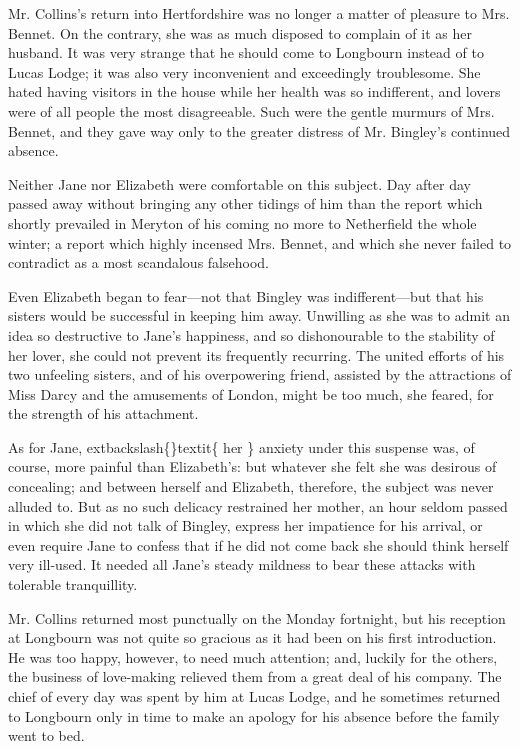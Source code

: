 \documentclass[10pt]{book}
\begin{document}
   Mr. Collins’s return into Hertfordshire was no longer a matter of
pleasure to Mrs. Bennet. On the contrary, she was as much disposed to
complain of it as her husband. It was very strange that he should come
to Longbourn instead of to Lucas Lodge; it was also very inconvenient
and exceedingly troublesome. She hated having visitors in the house
while her health was so indifferent, and lovers were of all people the
most disagreeable. Such were the gentle murmurs of Mrs. Bennet, and they
gave way
   only to the greater distress of Mr. Bingley’s continued
absence.
  

   Neither Jane nor Elizabeth were comfortable on this subject. Day after
day passed away without bringing any other tidings of him than the
report which shortly prevailed in Meryton of his coming no more to
Netherfield the whole winter; a report which highly incensed Mrs.
Bennet, and which she never failed to contradict as a most scandalous
falsehood.
  

   Even Elizabeth began to fear—not that Bingley was indifferent—but that
his sisters would be successful in keeping him away. Unwilling as she
was to admit an idea so destructive to Jane’s happiness, and so
dishonourable to the stability of her lover, she could not prevent its
frequently recurring. The united efforts of his two unfeeling sisters,
and of his overpowering friend, assisted by the attractions of Miss
Darcy and the amusements of London, might be too much, she feared, for
the strength of his attachment.
  

   As for Jane,
   	extbackslash\{\}textit\{
    her
   \}
   anxiety under this suspense was, of course, more
painful than Elizabeth’s: but whatever she felt she was desirous of
concealing; and between herself and Elizabeth, therefore, the subject
was never alluded to. But as no such delicacy restrained her mother, an
hour seldom passed in which she did not talk of Bingley, express her
impatience for his arrival, or even require Jane to confess that if he
did not come back she should think herself very ill-used. It needed all
Jane’s steady mildness to bear these attacks with tolerable
tranquillity.
  

   Mr. Collins returned most punctually on the Monday fortnight, but his
reception at Longbourn was not quite so gracious as it had been on his
first introduction. He was too happy, however, to need much attention;
and,
   luckily for the others, the business of love-making relieved them
from a great deal of his company. The chief of every day was spent by
him at Lucas Lodge, and he sometimes returned to Longbourn only in time
to make an apology for his absence before the family went to bed.
  
\end{document}
